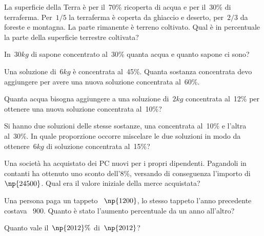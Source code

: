 \begin{multicols}{2}
\begin{esercizio}
 \label{ese:3.107}
La superficie della Terra è per il~70\% ricoperta di acqua e per il~30\% di terraferma.
Per~$1/5$ la terraferma è coperta da ghiaccio e deserto, per~$2/3$ da foreste e montagna.
La parte rimanente è terreno coltivato. Qual è in percentuale la parte della superficie terrestre coltivata?
\end{esercizio}

\begin{esercizio}[\Ast]
 \label{ese:3.108}
In~$30\unit{kg}$ di sapone concentrato al~30\% quanta acqua e quanto sapone ci sono?
\end{esercizio}

\begin{esercizio}
 \label{ese:3.109}
Una soluzione di~$6\unit{kg}$ è concentrata al~45\%. Quanta sostanza concentrata devo aggiungere per avere una nuova soluzione concentrata al~60\%.
\end{esercizio}

\begin{esercizio}
 \label{ese:3.110}
Quanta acqua bisogna aggiungere a una soluzione di~$2\unit{kg}$
concentrata al~12\% per ottenere una nuova soluzione concentrata al~10\%?
\end{esercizio}

\begin{esercizio}
 \label{ese:3.111}
Si hanno due soluzioni delle stesse sostanze, una concentrata al~10\% e l'altra al~30\%.
In quale proporzione occorre miscelare le due soluzioni in modo da ottenere~$6\unit{kg}$
di soluzione concentrata al~15\%?
\end{esercizio}

\begin{esercizio}
 \label{ese:3.112}
Una società ha acquistato dei PC nuovi per i propri dipendenti. Pagandoli in contanti ha ottenuto uno sconto dell'8\%,
versando di conseguenza l'importo di \officialeuro~$\np{24500}$. Qual era il valore iniziale della merce acquistata?
\end{esercizio}

\begin{esercizio}
 \label{ese:3.113}
Una persona paga un tappeto \officialeuro~$\np{1200}$, lo stesso tappeto l'anno precedente costava \officialeuro~$900$.
Quanto è stato l'aumento percentuale da un anno all'altro?
\end{esercizio}

\begin{esercizio}
 \label{ese:3.114}
Quanto vale il~$\np{2012}\%$ di~$\np{2012}$?
\end{esercizio}
\end{multicols}

